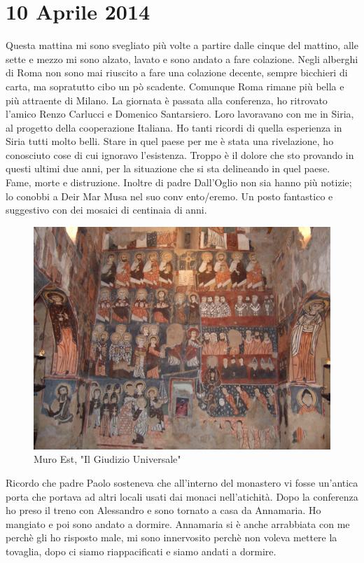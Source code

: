\section{10 Aprile 2014}

Questa mattina mi sono svegliato più volte a partire dalle cinque
del mattino, alle sette e mezzo mi sono alzato, lavato e sono andato
a fare colazione. Negli alberghi di Roma non sono mai riuscito a fare
una colazione decente, sempre bicchieri di carta, ma sopratutto cibo
un pò scadente. Comunque Roma rimane più bella e più attraente di
Milano. La giornata è passata alla conferenza, ho ritrovato l'amico
Renzo Carlucci e Domenico Santarsiero. Loro lavoravano con me in Siria,
al progetto della cooperazione Italiana. Ho tanti ricordi di quella esperienza in Siria tutti molto belli. Stare in quel paese per me è stata una rivelazione, ho conosciuto cose di cui ignoravo l'esistenza. Troppo è il dolore che sto provando in questi ultimi due anni, per la situazione che si sta delineando in quel paese. Fame, morte e distruzione. Inoltre di padre Dall'Oglio non sia hanno più notizie; lo conobbi a Deir Mar Musa nel suo conv ento/eremo. Un posto fantastico e suggestivo con dei mosaici di centinaia di anni.
\begin{figure}[!htbp]
 \centering
 \includegraphics[width=\linewidth]{DSCF0274.jpg}
 \caption{Muro Est, "Il Giudizio Universale"}
\end{figure}


Ricordo che padre Paolo sosteneva che all'interno del monastero vi fosse un'antica porta che portava ad altri locali usati dai monaci nell'atichità.
Dopo la conferenza ho preso il treno con Alessandro e sono tornato a casa da Annamaria. Ho mangiato e poi sono andato a dormire. Annamaria si è anche arrabbiata con me perchè gli ho risposto male, mi sono innervosito perchè non voleva mettere la tovaglia, dopo ci siamo riappacificati e siamo andati a dormire.
